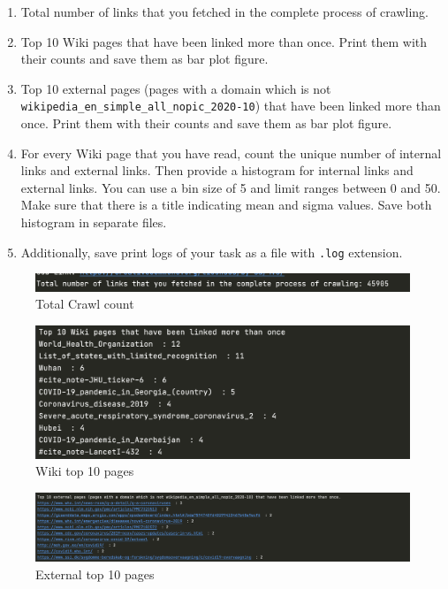 \documentclass{resources/WeSTassignment}
\begin{document}
\begin{enumerate}
\item Total number of links that you fetched in the complete process of crawling.
\item Top 10 Wiki pages that have been linked more than once. Print them with their counts and save them as bar plot figure.
\item Top 10 external pages (pages with a domain which is not \texttt{wikipedia\_en\_simple\_all\_nopic\_2020-10}) that have been linked more than once. Print them with their counts and save them as bar plot figure.
\item For every Wiki page that you have read, count the unique number of internal links and external links. Then provide a histogram for internal links and external links. You can use a bin size of 5 and limit ranges between 0 and 50. Make sure that there is a title indicating mean and sigma values. Save both histogram in separate files.
\item Additionally, save print logs of your task as a file with \texttt{.log} extension.
\end{enumerate}
\begin{figure}[h]
    \centering
    \includegraphics[scale=0.5]{resources/crawl_count.png}
    \caption{Total Crawl count}  
    \label{fig:crawl count}
\end{figure}
\begin{figure}[h]
    \centering
    \includegraphics[scale=0.5]{resources/wiki-top-ten.png}
    \caption{Wiki top 10 pages}  
    \label{fig:Wiki top 10 pages}
\end{figure}
\begin{figure}[h]
    \centering
    \includegraphics[scale=0.5]{resources/ext-top-ten.png}
    \caption{External top 10 pages}  
    \label{fig:External top 10 pages}
\end{figure}
\end{document}
